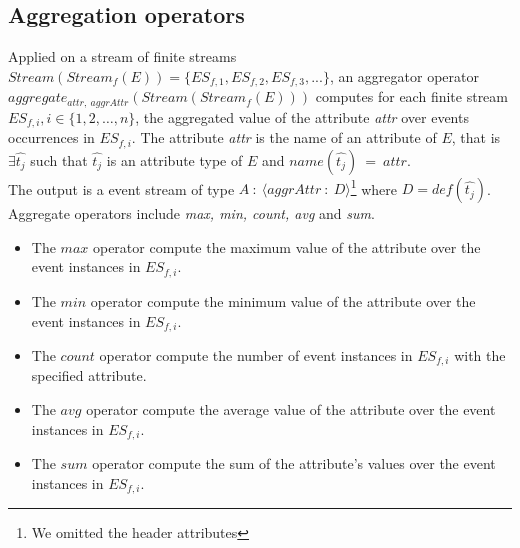 \subsection{Aggregation operators}
Applied on a stream of finite streams $Stream(Stream_f(E))= \{ES_{f,1}, ES_{f,2}, ES_{f,3}, ...\}$, an aggregator operator $aggregate_{attr,\ aggrAttr}(Stream(Stream_f(E)))$ computes for each finite stream $ES_{f,i}, i \in \{1, 2, …, n\}$, the aggregated value of the attribute \textit{attr} over events occurrences in $ES_{f,i}$.
The attribute \textit{attr} is the name of an attribute of $E$, that is $\exists \hat{t_j}$ such that $\hat{t_j}$ is an attribute type of $E$ and $name(\hat{t_j})\ =\ attr$.  
\\The output is a event stream of type $A\ :\ \langle aggrAttr\ :\ D \rangle$\footnote{We omitted the header attributes} 
where $D=def(\hat{t_j})$. 
\\ Aggregate operators include \textit{max, min, count, avg} and \textit{sum}. 
\begin{itemize}
 \item The $max$ operator compute the maximum value of the attribute over the event instances in $ES_{f,i}$.
 \item The $min$ operator compute the minimum value of the attribute over the event instances in $ES_{f,i}$.
 \item The $count$ operator compute the number of event instances in $ES_{f,i}$ with the specified attribute.
 \item The $avg$ operator compute the average value of the attribute over the event instances in $ES_{f,i}$.
 \item The $sum$ operator compute the sum of the attribute's values over the event instances in $ES_{f,i}$.
\end{itemize}

